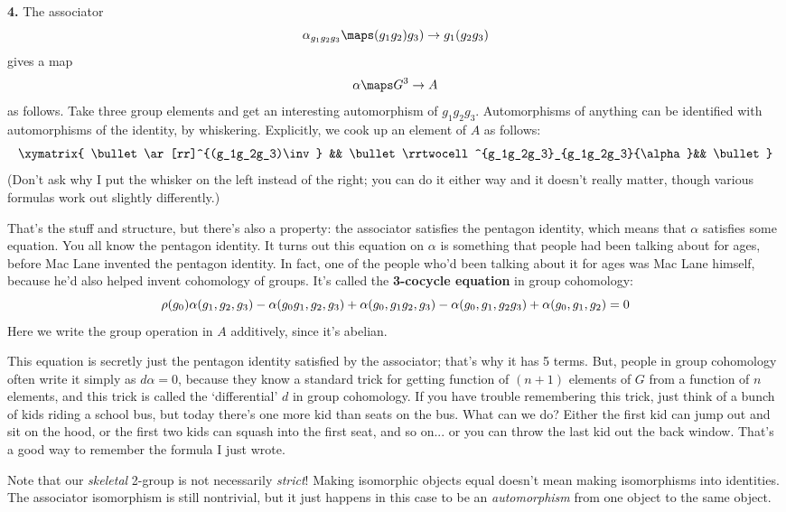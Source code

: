 \documentclass[12pt]{amsart}
\begin{document}
{\bf 4.} The associator
  \[ \alpha_{g_1g_2g_3}\maps (g_1g_2)g_3) \to g_1(g_2g_3) \]
  gives a map
  \[ \alpha\maps G^3\to A \]
  as follows.  Take three group elements and get an interesting
  automorphism of $g_1g_2g_3$.  Automorphisms of anything can be
  identified with automorphisms of the identity, by whiskering.
  Explicitly, we cook up an element of $A$ as follows:
  \[\xymatrix{
   \bullet \ar[rr]^{(g_1g_2g_3)\inv} && \bullet 
   \rrtwocell^{g_1g_2g_3}_{g_1g_2g_3}{\alpha}&& \bullet
  }\]
  (Don't ask why I put the whisker on the left instead of the
  right; you can do it either way and it doesn't really matter,
  though various formulas work out slightly differently.)

That's the stuff and structure, but there's also a property: the
  associator satisfies the pentagon identity, which means that
  $\alpha$ satisfies some equation.  You all know the pentagon
  identity.  It turns out this equation on $\alpha$ is something
  that people had been talking about for ages, before Mac Lane
  invented the pentagon identity.  In fact, one of the people who'd been
  talking about it for ages was Mac Lane himself, because he'd also
  helped invent cohomology of groups.  It's called the 
  \textbf{3-cocycle equation}
  in group cohomology:  
   \[
  \rho(g_0)\alpha(g_1,g_2,g_3) - \alpha(g_0g_1, g_2, g_3) +  
  \alpha(g_0, g_1g_2, g_3) \\ - \alpha(g_0, g_1, g_2g_3) +
  \alpha(g_0, g_1, g_2) = 0
  \]
  Here we write the group operation in $A$ additively, since it's abelian.

  This equation is secretly just the pentagon identity satisfied by the
  associator; that's why it has 5 terms.  But, people in group cohomology
  often write it simply as $d\alpha=0$, because they know a standard
  trick for getting function of $(n+1)$ elements of $G$ from a function 
  of $n$ elements, and this trick is called the `differential' $d$ in 
  group cohomology.  If you have trouble remembering this trick, just 
  think of a bunch of kids riding a school bus, but today there's one
  more kid than seats on the bus.  What can we do?  Either the first kid
  can jump out and sit on the hood, or the first two kids can squash 
  into the first seat, and so on... or you can throw the last kid out 
  the back window.  That's a good way to remember the formula I just wrote.

Note that our \emph{skeletal} 2-group is not necessarily
\emph{strict}!  Making isomorphic objects equal doesn't mean making
isomorphisms into identities.  The associator isomorphism is still
nontrivial, but it just happens in this case to be an
\emph{automorphism} from one object to the same object.
\end{document}

